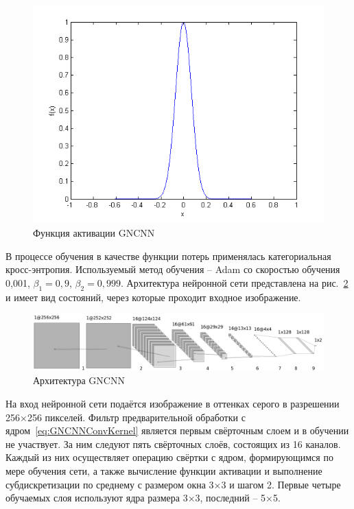 \begin{figure}
\centering
\includegraphics[width=1\textwidth]{include/graphics/im_2-gaussian_function}
\caption{Функция активации GNCNN}
\label{fig:GaussianFunction}
\end{figure}

В процессе обучения в качестве функции потерь применялась категориальная кросс-энтропия. Используемый метод обучения – Adam со скоростью обучения 0,001, $ \beta_1 = 0,9 $, $ \beta_2 = 0,999 $. Архитектура нейронной сети представлена на рис.~\ref{fig:GNCNNArchitecture} и имеет вид состояний, через которые проходит входное изображение.

\begin{figure}
\centering
\includegraphics[width=1\textwidth]{include/graphics/im_3-gncnn_gray_architecture}
\caption{Архитектура GNCNN}
\label{fig:GNCNNArchitecture}
\end{figure}

На вход нейронной сети подаётся изображение в оттенках серого в разрешении 256×256 пикселей. Фильтр предварительной обработки с ядром~\eqref{eq:GNCNNConvKernel} является первым свёрточным слоем и в обучении не участвует. За ним следуют пять свёрточных слоёв, состоящих из 16 каналов. Каждый из них осуществляет операцию свёртки с ядром, формирующимся по мере обучения сети, а также вычисление функции активации и выполнение субдискретизации по среднему с размером окна 3×3 и шагом 2. Первые четыре обучаемых слоя используют ядра размера 3×3, последний – 5×5.

